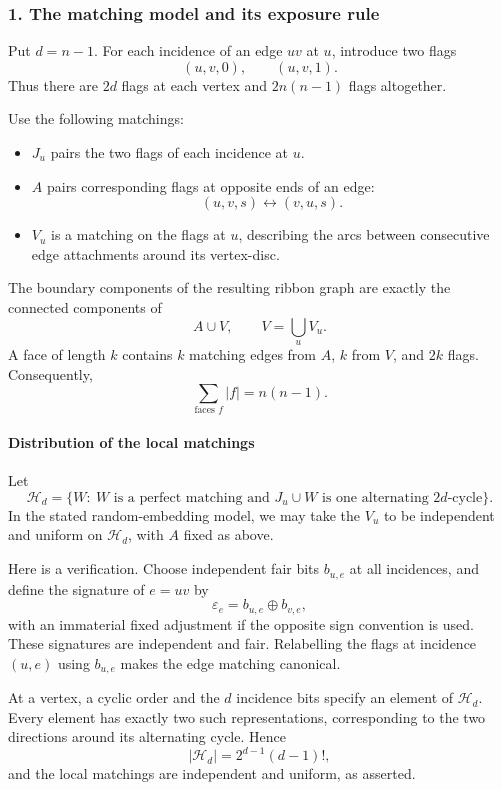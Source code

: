 \documentclass[
  11pt,
  a4paper,
]{article}
\providecommand{\tightlist}{%
  \setlength{\itemsep}{0pt}\setlength{\parskip}{0pt}}
\begin{document}
\subsubsection{1. The matching model and its exposure
rule}\label{the-matching-model-and-its-exposure-rule}

Put \(d=n-1\). For each incidence of an edge \(uv\) at \(u\), introduce
two flags \[
(u,v,0),\qquad (u,v,1).
\] Thus there are \(2d\) flags at each vertex and \(2n(n-1)\) flags
altogether.

Use the following matchings:

\begin{itemize}
\tightlist
\item
  \(J_u\) pairs the two flags of each incidence at \(u\).
\item
  \(A\) pairs corresponding flags at opposite ends of an edge: \[
  (u,v,s)\longleftrightarrow(v,u,s).
  \]
\item
  \(V_u\) is a matching on the flags at \(u\), describing the arcs
  between consecutive edge attachments around its vertex-disc.
\end{itemize}

The boundary components of the resulting ribbon graph are exactly the
connected components of \[
A\cup V,\qquad V=\bigcup_u V_u.
\] A face of length \(k\) contains \(k\) matching edges from \(A\),
\(k\) from \(V\), and \(2k\) flags. Consequently, \[
\sum_{\text{faces }f}|f|=n(n-1).
\]

\paragraph{Distribution of the local
matchings}\label{distribution-of-the-local-matchings}

Let \[
\mathcal H_d
=
\{W:\ W\text{ is a perfect matching and }J_u\cup W
       \text{ is one alternating }2d\text{-cycle}\}.
\] In the stated random-embedding model, we may take the \(V_u\) to be
independent and uniform on \(\mathcal H_d\), with \(A\) fixed as above.

Here is a verification. Choose independent fair bits \(b_{u,e}\) at all
incidences, and define the signature of \(e=uv\) by \[
\varepsilon_e=b_{u,e}\oplus b_{v,e},
\] with an immaterial fixed adjustment if the opposite sign convention
is used. These signatures are independent and fair. Relabelling the
flags at incidence \((u,e)\) using \(b_{u,e}\) makes the edge matching
canonical.

At a vertex, a cyclic order and the \(d\) incidence bits specify an
element of \(\mathcal H_d\). Every element has exactly two such
representations, corresponding to the two directions around its
alternating cycle. Hence \[
|\mathcal H_d|=2^{d-1}(d-1)!,
\] and the local matchings are independent and uniform, as asserted.
\end{document}
